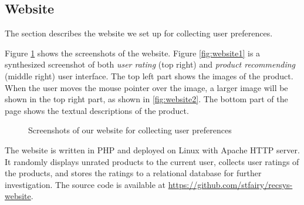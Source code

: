 \subsection{Website}

The section describes the website we set up for collecting user preferences.

Figure \ref{fig:website} shows the screenshots of the website.
Figure \ref{fig:website1} is a synthesized screenshot of both \emph{user rating} (top right) and \emph{product recommending} (middle right) user interface. The top left part shows the images of the product. When the user moves the mouse pointer over the image, a larger image will be shown in the top right part, as shown in \ref{fig:website2}. The bottom part of the page shows the textual descriptions of the product.

\begin{figure}[htb]
  \centering
  \qquad
  \caption{Screenshots of our website for collecting user preferences}
  \label{fig:website}
\end{figure}

The website is written in PHP and deployed on Linux with Apache HTTP server. It randomly displays unrated products to the current user, collects user ratings of the products, and stores the ratings to a relational database for further investigation. The source code is available at \url{https://github.com/stfairy/recsys-website}.
